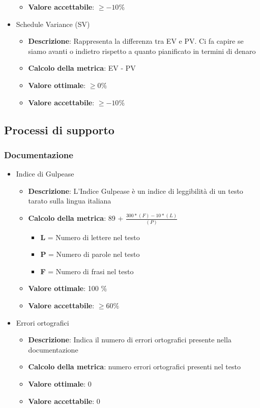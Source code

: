 \documentclass[12pt]{article}
\begin{document}
\begin{itemize}
\begin{itemize}
		\item \textbf{Valore accettabile}: $\ge -10\%$
	\end{itemize}
	\item Schedule Variance (SV)
	\begin{itemize}
		\item \textbf{Descrizione}: Rappresenta la differenza tra EV e PV. Ci fa capire se siamo avanti o indietro rispetto a quanto pianificato in termini di denaro
		\item \textbf{Calcolo della metrica}:  EV - PV
		\item \textbf{Valore ottimale}: $\ge 0\%$
		\item \textbf{Valore accettabile}: $\ge -10\%$
	\end{itemize}
\end{itemize}
\subsection{Processi di supporto}
\subsubsection{Documentazione}
\begin{itemize}
	\item Indice di Gulpease
	\begin{itemize}
		\item \textbf{Descrizione}: L'Indice Gulpease è un indice di leggibilità di un testo tarato sulla lingua italiana
		\item \textbf{Calcolo della metrica}:  89 + $\frac{300*(F) - 10 * (L)}{(P)}$
		\begin{itemize}
			\item \textbf{L} = Numero di lettere nel testo
			\item \textbf{P} = Numero di parole nel testo
			\item \textbf{F} = Numero di frasi nel testo
		\end{itemize}
		\item \textbf{Valore ottimale}: 100 \%
		\item \textbf{Valore accettabile}: $\ge 60\%$
	\end{itemize}
\end{itemize}
\begin{itemize}
	\item Errori ortografici
	\begin{itemize}
		\item \textbf{Descrizione}: Indica il numero di errori ortografici presente nella documentazione
		\item \textbf{Calcolo della metrica}: numero errori ortografici presenti nel testo
		\item \textbf{Valore ottimale}: 0
		\item \textbf{Valore accettabile}: 0
	\end{itemize}
\end{itemize}
\end{document}
